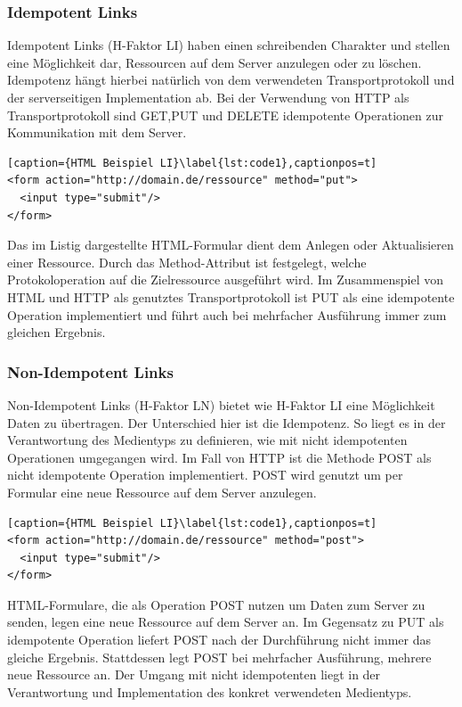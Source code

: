\subsubsection{Idempotent Links}
Idempotent Links (H-Faktor LI) haben einen schreibenden Charakter und stellen eine Möglichkeit dar, Ressourcen auf dem Server anzulegen oder zu löschen. Idempotenz hängt hierbei natürlich von dem verwendeten Transportprotokoll und der serverseitigen Implementation ab. Bei der Verwendung von HTTP als Transportprotokoll sind GET,PUT und DELETE idempotente Operationen zur Kommunikation mit dem Server.\\
\begin{lstlisting}[caption={HTML Beispiel LI}\label{lst:code1},captionpos=t]
<form action="http://domain.de/ressource" method="put">
  <input type="submit"/>
</form>
\end{lstlisting}
Das im Listig dargestellte HTML-Formular dient dem Anlegen oder Aktualisieren einer Ressource. Durch das Method-Attribut ist festgelegt, welche Protokoloperation auf die Zielressource ausgeführt wird. Im Zusammenspiel von HTML und HTTP als genutztes Transportprotokoll ist PUT als eine idempotente Operation implementiert und führt auch bei mehrfacher Ausführung immer zum gleichen Ergebnis.


\subsubsection{Non-Idempotent Links}
Non-Idempotent Links (H-Faktor LN) bietet wie H-Faktor LI eine Möglichkeit Daten zu übertragen. Der Unterschied hier ist die Idempotenz. So liegt es in der Verantwortung des Medientyps zu definieren, wie mit nicht idempotenten Operationen umgegangen wird. Im Fall von HTTP ist die Methode POST als nicht idempotente Operation implementiert. POST wird genutzt um per Formular eine neue Ressource auf dem Server anzulegen.\\
\begin{lstlisting}[caption={HTML Beispiel LI}\label{lst:code1},captionpos=t]
<form action="http://domain.de/ressource" method="post">
  <input type="submit"/>
</form>
\end{lstlisting}
HTML-Formulare, die als Operation POST nutzen um Daten zum Server zu senden, legen eine neue Ressource auf dem Server an. Im Gegensatz zu PUT als idempotente Operation liefert POST nach der Durchführung nicht immer das gleiche Ergebnis. Stattdessen legt POST bei mehrfacher Ausführung, mehrere neue Ressource an. Der Umgang mit nicht idempotenten liegt in der Verantwortung und Implementation des konkret verwendeten Medientyps.





